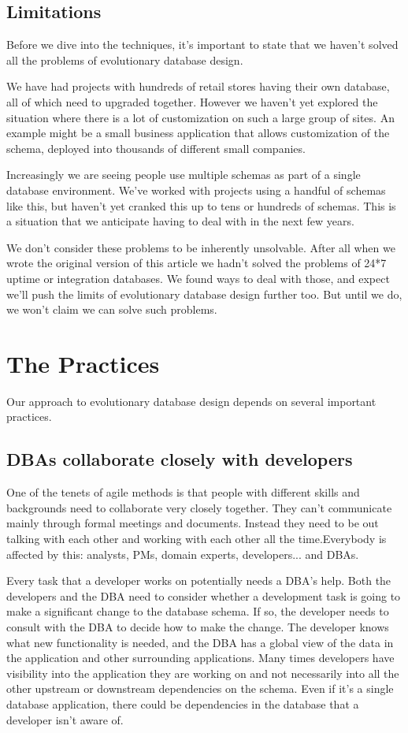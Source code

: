 \documentclass[12pt]{article}
\begin{document}
\subsection{Limitations}

Before we dive into the techniques, it's important to state that we
haven't solved all the problems of evolutionary database design.

We have had projects with hundreds of retail stores having their own
database, all of which need to upgraded together. However we haven't yet
explored the situation where there is a lot of customization on such a
large group of sites. An example might be a small business application
that allows customization of the schema, deployed into thousands of
different small companies.

Increasingly we are seeing people use multiple schemas as part of a
single database environment. We've worked with projects using a handful
of schemas like this, but haven't yet cranked this up to tens or
hundreds of schemas. This is a situation that we anticipate having to
deal with in the next few years.

We don't consider these problems to be inherently unsolvable. After all
when we wrote the original version of this article we hadn't solved the
problems of 24*7 uptime or integration databases. We found ways to deal
with those, and expect we'll push the limits of evolutionary database
design further too. But until we do, we won't claim we can solve such
problems.

\section{The Practices}
Our approach to evolutionary database design depends on several important practices.

\subsection{DBAs collaborate closely with developers}

One of the tenets of agile methods is that people with different skills
and backgrounds need to collaborate very closely together. They can't
communicate mainly through formal meetings and documents. Instead they
need to be out talking with each other and working with each other all
the time.Everybody is affected by this: analysts, PMs, domain experts,
developers... and DBAs.

Every task that a developer works on potentially needs a DBA's help.
Both the developers and the DBA need to consider whether a development
task is going to make a significant change to the database schema. If
so, the developer needs to consult with the DBA to decide how to make
the change. The developer knows what new functionality is needed, and
the DBA has a global view of the data in the application and other
surrounding applications. Many times developers have visibility into the
application they are working on and not necessarily into all the other
upstream or downstream dependencies on the schema. Even if it's a single
database application, there could be dependencies in the database that a
developer isn't aware of.
\end{document}
